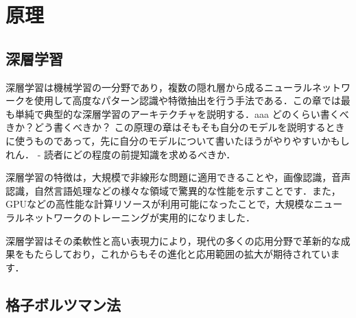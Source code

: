 \chapter{原理 \label{chap:principles}}
\section{深層学習 \label{section:deep-learning}}
深層学習は機械学習の一分野であり，複数の隠れ層から成るニューラルネットワークを使用して高度なパターン認識や特徴抽出を行う手法である．この章では最も単純で典型的な深層学習のアーキテクチャを説明する．aaa
どのくらい書くべきか？どう書くべきか？
この原理の章はそもそも自分のモデルを説明するときに使うものであって，先に自分のモデルについて書いたほうがやりやすいかもしれん．
- 読者にどの程度の前提知識を求めるべきか．
\fi

深層学習の特徴は，大規模で非線形な問題に適用できることや，画像認識，音声認識，自然言語処理などの様々な領域で驚異的な性能を示すことです．また，GPUなどの高性能な計算リソースが利用可能になったことで，大規模なニューラルネットワークのトレーニングが実用的になりました．

深層学習はその柔軟性と高い表現力により，現代の多くの応用分野で革新的な成果をもたらしており，これからもその進化と応用範囲の拡大が期待されています．

\section{格子ボルツマン法 \label{section:lbm}}
